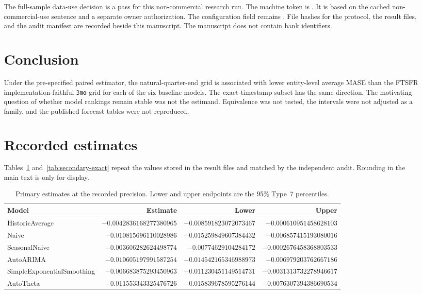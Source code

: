 \documentclass[11pt]{article}
\begin{document}
The full-sample data-use decision is a pass for this non-commercial research run.
The machine token is {\small{}}.
It is based on the cached non-commercial-use sentence and a separate owner authorization.
The configuration field  remains . File hashes for the protocol, the result files, and the audit manifest are recorded beside this manuscript. The manuscript does not contain bank identifiers.

\section{Conclusion}
\label{sec:conclusion}

Under the pre-specified paired estimator, the natural-quarter-end grid is associated with lower entity-level average MASE than the FTSFR implementation-faithful \texttt{3mo} grid for each of the six baseline models. The exact-timestamp subset has the same direction. The motivating question of whether model rankings remain stable was not the estimand. Equivalence was not tested, the intervals were not adjusted as a family, and the published forecast tables were not reproduced.

\appendix
\section{Recorded estimates}
\label{app:exact}

Tables~\ref{tab:primary-exact} and~\ref{tab:secondary-exact} repeat the values stored in the result files and matched by the independent audit. Rounding in the main text is only for display.

\begin{table}[ht]
\centering
\caption{Primary estimates at the recorded precision. Lower and upper endpoints are the 95\% Type~7 percentiles.}
\label{tab:primary-exact}
\scriptsize
\setlength{\tabcolsep}{4pt}
\begin{tabular}{lrrr}
\toprule
Model & Estimate & Lower & Upper \\
\midrule
HistoricAverage & $-0.0042836168277380965$ & $-0.008591823072073467$ & $-0.000610951458628103$ \\
Naive & $-0.010815696110028986$ & $-0.015259849607384432$ & $-0.006857415193080016$ \\
SeasonalNaive & $-0.003606282624498774$ & $-0.00774629104284172$ & $-0.0002676458368803533$ \\
AutoARIMA & $-0.010605197991587254$ & $-0.014542165346988973$ & $-0.006979203762667186$ \\
SimpleExponentialSmoothing & $-0.006683875293450963$ & $-0.011230451149514731$ & $-0.0031313732278946617$ \\
AutoTheta & $-0.011553343325476726$ & $-0.015839678595276144$ & $-0.0076307394386690534$ \\
\bottomrule
\end{tabular}
\end{table}
\end{document}
